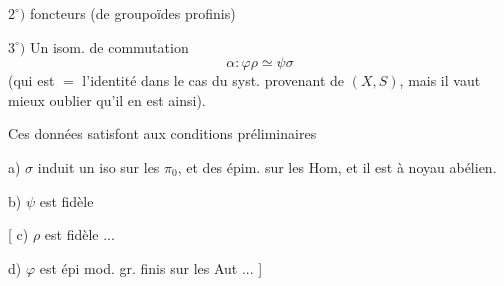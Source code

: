 $2^\circ)$   foncteurs
(de groupoïdes profinis)

$3^\circ)$ Un isom. de commutation
\[
\alpha:\varphi\rho\simeq\psi\sigma
\]
(qui est $=$ l'identité dans le cas du syst. provenant de $(X,S)$,
mais  il vaut mieux oublier qu'il en est ainsi).

Ces données satisfont aux conditions 
préliminaires

a) $\sigma$ induit un iso sur les $\pi_0$, et des épim. sur les Hom,
et il est à noyau abélien.

b) $\psi$ est fidèle

[ c) $\rho$ est fidèle ...

d) $\varphi$ est épi mod. gr. finis sur les Aut ... ]

